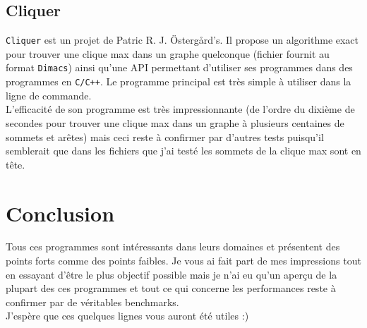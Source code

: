 \subsection{Cliquer}
\verb?Cliquer? est un projet de Patric R. J. Östergård's.
Il propose un algorithme exact pour trouver une clique max dans un graphe quelconque (fichier
fournit au format \verb?Dimacs?) ainsi qu'une API permettant d'utiliser ses programmes dans
des programmes en \verb?C/C++?. Le programme principal est très simple à utiliser
dans la ligne de commande.\\

L'efficacité de son programme est très impressionnante (de l'ordre du dixième de secondes pour
trouver une clique max dans un graphe à plusieurs centaines de sommets et arêtes) mais ceci
reste à confirmer par d'autres tests puisqu'il semblerait que dans les fichiers que j'ai testé
les sommets de la clique max sont en tête.


\section{Conclusion}
Tous ces programmes sont intéressants dans leurs domaines et présentent des points forts comme des points faibles.
Je vous ai fait part de mes impressions tout en essayant d'être le plus objectif
possible mais je n'ai eu qu'un aperçu de la plupart des ces programmes et
tout ce qui concerne les performances reste à
confirmer par de véritables benchmarks.\\

J'espère que ces quelques lignes vous auront été utiles :)